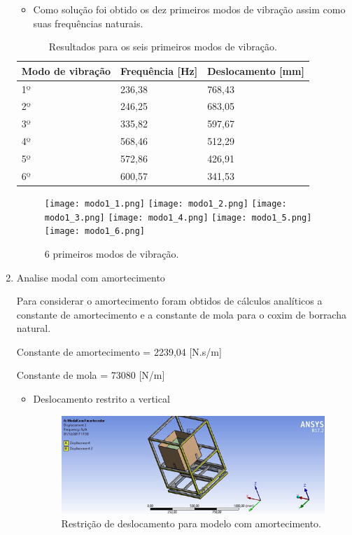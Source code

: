 \begin{enumerate}
\begin{itemize}
		\item Como solução foi obtido os dez primeiros modos de vibração assim como suas frequências naturais.
	\end{itemize}
	
	\begin{table}[H]
		\centering
		\caption{Resultados para os seis primeiros modos de vibração.}
		\begin{tabular}{|l|l|l|}
			\hline
			Modo de vibração & Frequência {[}Hz{]} & Deslocamento {[}mm{]} \\ \hline
			1º               & 236,38              & 768,43                \\ \hline
			2º               & 246,25              & 683,05                \\ \hline
			3º               & 335,82              & 597,67                \\ \hline
			4º               & 568,46              & 512,29                \\ \hline
			5º               & 572,86              & 426,91                \\ \hline
			6º               & 600,57              & 341,53                \\ \hline
		\end{tabular}
	\end{table}
	
	\begin{figure}[H]
		\centering
		\texttt{[image: modo1\_1.png]}
		\texttt{[image: modo1\_2.png]}
		\texttt{[image: modo1\_3.png]}
		\texttt{[image: modo1\_4.png]}
		\texttt{[image: modo1\_5.png]}
		\texttt{[image: modo1\_6.png]}
		\caption{6 primeiros modos de vibração.}
	\end{figure}
	
	\item Analise modal com amortecimento
	
	Para considerar o amortecimento foram obtidos de cálculos analíticos a constante de amortecimento e a constante de mola para o coxim de borracha natural.
	
	Constante de amortecimento = 2239,04 [N.s/m]
	
	Constante de mola = 73080 [N/m]
	
	\begin{itemize}
		\item Deslocamento restrito a vertical
		
		\begin{figure}[H]
			\centering
			\includegraphics[width=350pt]{figuras/restricao2.png}
			\caption{Restrição de deslocamento para modelo com amortecimento.}
		\end{figure}
		

\end{itemize}
\end{enumerate}
